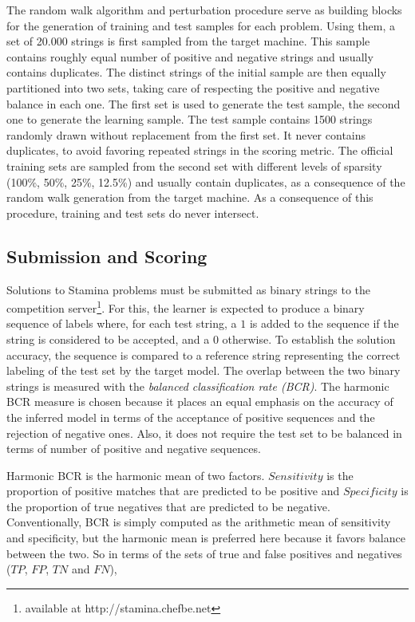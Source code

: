 The random walk algorithm and perturbation procedure serve as building blocks for the generation of training and test samples for each problem. Using them, a set of 20.000 strings is first sampled from the target machine. This sample contains roughly equal number of positive and negative strings and usually contains duplicates. The distinct strings of the initial sample are then equally partitioned into two sets, taking care of respecting the positive and negative balance in each one. The first set is used to generate the test sample, the second one to generate the learning sample. The test sample contains 1500 strings randomly drawn without replacement from the first set. It never contains duplicates, to avoid favoring repeated strings in the scoring metric. The official training sets are sampled from the second set with different levels of sparsity (100\%, 50\%, 25\%, 12.5\%) and usually contain duplicates, as a consequence of the random walk generation from the target machine. As a consequence of this procedure, training and test sets do never intersect.

\subsection{Submission and Scoring\label{subsection:stamina-scoring}}

Solutions to Stamina problems must be submitted as binary strings to the competition server\footnote{available at http://stamina.chefbe.net}. For this, the learner is expected to produce a binary sequence of labels where, for each test string, a $1$ is added to the sequence if the string is considered to be accepted, and a $0$ otherwise. To establish the solution accuracy, the sequence is compared to a reference string representing the correct labeling of the test set by the target model. The overlap between the two binary strings is measured with the \emph{balanced classification rate (BCR)}. The harmonic BCR measure is chosen because it places an equal emphasis on the accuracy of the inferred model in terms of the acceptance of positive sequences and the rejection of negative ones. Also, it does not require the test set to be balanced in terms of number of positive and negative sequences. 

Harmonic BCR is the harmonic mean of two factors. $Sensitivity$ is the proportion of positive matches that are predicted to be positive and $Specificity$ is the proportion of true negatives that are predicted to be negative. Conventionally, BCR is simply computed as the arithmetic mean of sensitivity and specificity, but the harmonic mean is preferred here because it favors balance between the two. So in terms of the sets of true and false positives and negatives ($TP$, $FP$, $TN$ and $FN$),

